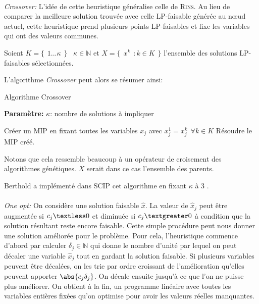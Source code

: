 \documentclass[12pt,a4paper,oneside]{book}
\theoremstyle{definition}
\newcommand{\N}{\mathbb{N}}
\begin{document}
	\paragraph{}
	\textit{Crossover:} L'idée de cette heuristique généralise celle de \textsc{Rins}. Au lieu de comparer la meilleure solution trouvée avec celle LP-faisable générée au nœud actuel, cette heuristique prend plusieurs points LP-faisables et fixe les variables qui ont des valeurs communes.
	
	Soient $K =  \{\hspace{5pt}1...\kappa \hspace{5pt}\} \hspace{10pt} \kappa \in \N $ et  $X = \{\hspace{5pt} x^k \hspace{5pt} : k \in K \hspace{5pt}\}$ l'ensemble des solutions LP-faisables sélectionnées.
	
	L'algorithme \textit{Crossover} peut alors se résumer ainsi:
	
	\begin{algorithm}
		\caption{Algorithme Crossover}
		\SetAlgoLined
		\DontPrintSemicolon
		
		\textbf{Paramètre:} $\kappa$: nombre de solutions à impliquer \;
		
		{
			Créer un MIP en fixant toutes les variables $x_j$ avec $x^1_j = x^k_j \hspace{5pt} \forall k \in K$ \;
			Résoudre le MIP créé.
		}
		
	\end{algorithm}

	Notons que cela ressemble beaucoup à un opérateur de croisement des algorithmes génétiques. $X$ serait dans ce cas l'ensemble des parents.
	
	Berthold a implémenté dans SCIP cet algorithme en fixant $\kappa$ à 3 \cite{Hendel2011}.
	
	
	\paragraph{}
	\textit{One opt:} On considère une solution faisable $\hat{x}$. La valeur de $\hat{x}_j$ peut être augmentée si $ c_j \textless 0 $ et diminuée si $ c_j \textgreater 0$ à condition que la solution résultant reste encore faisable. Cette simple procédure peut nous donner une solution améliorée pour le problème. Pour cela, l'heuristique commence d'abord par calculer $\delta_j \in \N$ qui donne le nombre d'unité par lequel on peut décaler une variable $\hat{x}_j$ tout en gardant la solution faisable. Si plusieurs variables peuvent être décalées, on les trie par ordre croissant de l'amélioration qu'elles peuvent apporter $\abs{c_j \delta_j}$. On décale ensuite jusqu'à ce que l'on ne puisse plus améliorer. On obtient à la fin, un programme linéaire avec toutes les variables entières fixées qu'on optimise pour avoir les valeurs réelles manquantes.
	
\end{document}

